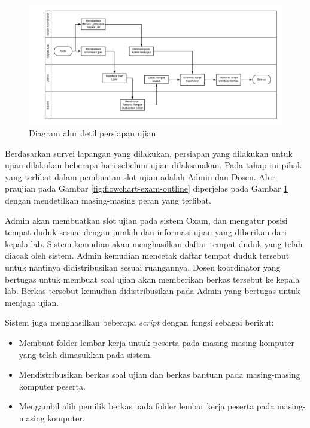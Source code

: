         \begin{figure}
            \centering
            \includegraphics[width=0.75\paperheight]{Gambar/flowchart/exam-flow-ujian-pra.pdf}
            \caption{Diagram alur detil persiapan ujian.}
            \label{fig:flowchart-exam-preexam}
        \end{figure}
        
        Berdasarkan survei lapangan yang dilakukan, persiapan yang dilakukan
        untuk ujian dilakukan beberapa hari sebelum ujian dilaksanakan. Pada
        tahap ini pihak yang terlibat dalam pembuatan slot ujian adalah Admin
        dan Dosen. Alur praujian pada Gambar \ref{fig:flowchart-exam-outline}
        diperjelas pada Gambar \ref{fig:flowchart-exam-preexam} dengan
        mendetilkan masing-masing peran yang terlibat.
        
        Admin akan membuatkan slot ujian pada sistem Oxam, dan mengatur posisi
        tempat duduk sesuai dengan jumlah dan informasi ujian yang diberikan
        dari kepala lab. Sistem kemudian akan menghasilkan daftar tempat duduk
        yang telah diacak oleh sistem. Admin kemudian mencetak daftar tempat
        duduk tersebut untuk nantinya didistribusikan sesuai ruangannya. Dosen
        koordinator yang bertugas untuk membuat soal ujian akan memberikan
        berkas tersebut ke kepala lab. Berkas tersebut kemudian didistribusikan
        pada Admin yang bertugas untuk menjaga ujian.
        
        Sistem juga menghasilkan beberapa \textit{script} dengan fungsi sebagai
        berikut:
        \begin{itemize}
            \item Membuat folder lembar kerja untuk peserta pada masing-masing
                komputer yang telah dimasukkan pada sistem.
            \item Mendistribusikan berkas soal ujian dan berkas bantuan pada
                masing-masing komputer peserta.
            \item Mengambil alih pemilik berkas pada folder lembar kerja peserta
                pada masing-masing komputer.
        \end{itemize}
        
